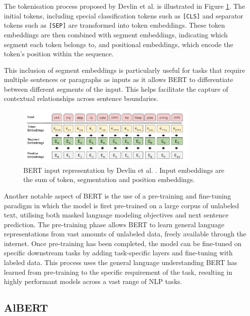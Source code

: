 The tokenisation process proposed by Devlin et al. \cite{BERT} is illustrated in Figure \ref{fig:bert}. The initial tokens, including special classification tokens such as \verb|[CLS]| and separator tokens such as \verb|[SEP]| are transformed into token embeddings. These token embeddings are then combined with segment embeddings, indicating which segment each token belongs to, and positional embeddings, which encode the token's position within the sequence.

This inclusion of segment embeddings is particularly useful for tasks that require multiple sentences or paragraphs as inputs as it allows BERT to differentiate between different segments of the input. This helps facilitate the capture of contextual relationships across sentence boundaries.

\begin{figure}[H]
    \centering
    \includegraphics[width=0.8\textwidth]{graphs/bert.png}
    \caption{BERT input representation by Devlin et al. \cite{BERT}. Input embeddings are the sum of token, segmentation and position embeddings.}
    \label{fig:bert}
\end{figure}

Another notable aspect of BERT is the use of a pre-training and fine-tuning paradigm in which the model is first pre-trained on a large corpus of unlabeled text, utilising both masked language modeling objectives and next sentence prediction. The pre-training phase allows BERT to learn general language representations from vast amounts of unlabeled data, freely available through the internet. Once pre-training has been completed, the model can be fine-tuned on specific downstream tasks by adding task-specific layers and fine-tuning with labeled data. This process uses the general language understanding BERT has learned from pre-training to the specific requirement of the task, resulting in highly performant models across a vast range of NLP tasks.

\subsection{AlBERT}

